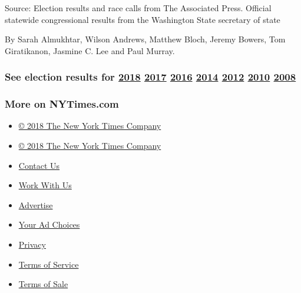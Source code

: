 Source: Election results and race calls from The Associated Press.
Official statewide congressional results from the Washington State
secretary of state

By Sarah Almukhtar, Wilson Andrews, Matthew Bloch, Jeremy Bowers, Tom
Giratikanon, Jasmine C. Lee and Paul Murray.

\hypertarget{see-election-results-for-2018-2017-2016-2014-2012-2010-2008}{%
\subsubsection{\texorpdfstring{See election results for
\href{https://www.nytimes3xbfgragh.onion/interactive/2018/us/elections/calendar-primary-results.html}{2018}
\href{https://www.nytimes3xbfgragh.onion/interactive/2017/us/elections/election-calendar.html}{2017}
\href{https://www.nytimes3xbfgragh.onion/elections/results/president}{2016}
\href{https://www.nytimes3xbfgragh.onion/elections/2014/results/senate}{2014}
\href{https://www.nytimes3xbfgragh.onion/elections/2012/results/president.html}{2012}
\href{https://www.nytimes3xbfgragh.onion/elections/2010/results/senate.html}{2010}
\href{https://www.nytimes3xbfgragh.onion/elections/2008/results/president/map.html}{2008}}{See election results for 2018 2017 2016 2014 2012 2010 2008}}\label{see-election-results-for-2018-2017-2016-2014-2012-2010-2008}}

\hypertarget{more-on-nytimescom}{%
\subsubsection{More on NYTimes.com}\label{more-on-nytimescom}}

\begin{itemize}
\tightlist
\item
  \href{http://www.nytco.com}{© 2018 The New York Times Company}
\end{itemize}

\begin{itemize}
\tightlist
\item
  \href{http://www.nytco.com}{© 2018 The New York Times Company}
\item
  \href{http://www.nytimes3xbfgragh.onion/ref/membercenter/help/infoservdirectory.html}{Contact
  Us}
\item
  \href{http://www.nytco.com/careers}{Work With Us}
\item
  \href{http://www.nytimes.whsites.net/mediakit}{Advertise}
\item
  \href{http://www.nytimes3xbfgragh.onion/content/help/rights/privacy/policy/privacy-policy.html\#pp}{Your
  Ad Choices}
\item
  \href{http://www.nytimes3xbfgragh.onion/privacy}{Privacy}
\item
  \href{http://www.nytimes3xbfgragh.onion/ref/membercenter/help/agree.html}{Terms
  of Service}
\item
  \href{http://www.nytimes3xbfgragh.onion/content/help/rights/sale/terms-of-sale.html}{Terms
  of Sale}
\end{itemize}

